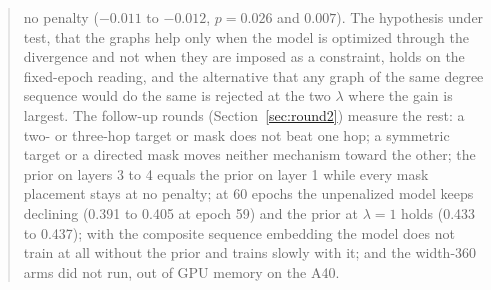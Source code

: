 \documentclass[10pt,a4paper]{article}
\begin{document}
\begin{abstract}
no penalty ($-0.011$ to $-0.012$, $p = 0.026$ and $0.007$). The hypothesis under test,
that the graphs help only when the model is optimized through the divergence and not when
they are imposed as a constraint, holds on the fixed-epoch reading, and the alternative
that any graph of the same degree sequence would do the same is rejected at the two
$\lambda$ where the gain is largest. The follow-up rounds (Section~\ref{sec:round2})
measure the rest: a two- or three-hop target or mask does not beat one hop; a symmetric
target or a directed mask moves neither mechanism toward the other; the prior on layers
3 to 4 equals the prior on layer 1 while every mask placement stays at no penalty; at 60
epochs the unpenalized model keeps declining (0.391 to 0.405 at epoch 59) and the prior
at $\lambda = 1$ holds (0.433 to 0.437); with the composite sequence embedding the model
does not train at all without the prior and trains slowly with it; and the width-360 arms
did not run, out of GPU memory on the A40.
\end{abstract}

\vspace{0.5em}
\tccontents
\clearpage







\end{document}
